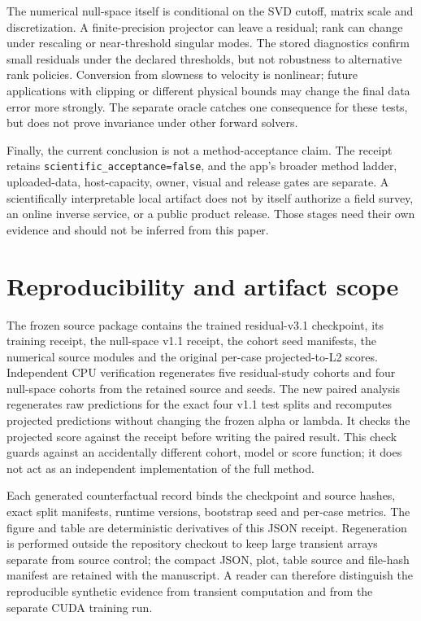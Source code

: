 \documentclass[11pt]{article}
\begin{document}
The numerical null-space itself is conditional on the SVD cutoff, matrix scale and discretization. A finite-precision projector can leave a residual; rank can change under rescaling or near-threshold singular modes. The stored diagnostics confirm small residuals under the declared thresholds, but not robustness to alternative rank policies. Conversion from slowness to velocity is nonlinear; future applications with clipping or different physical bounds may change the final data error more strongly. The separate oracle catches one consequence for these tests, but does not prove invariance under other forward solvers.

Finally, the current conclusion is not a method-acceptance claim. The receipt retains \texttt{scientific\_acceptance=false}, and the app's broader method ladder, uploaded-data, host-capacity, owner, visual and release gates are separate. A scientifically interpretable local artifact does not by itself authorize a field survey, an online inverse service, or a public product release. Those stages need their own evidence and should not be inferred from this paper.

\section{Reproducibility and artifact scope}\label{sec:reproducibility}
The frozen source package contains the trained residual-v3.1 checkpoint, its training receipt, the null-space v1.1 receipt, the cohort seed manifests, the numerical source modules and the original per-case projected-to-L2 scores. Independent CPU verification regenerates five residual-study cohorts and four null-space cohorts from the retained source and seeds. The new paired analysis regenerates raw predictions for the exact four v1.1 test splits and recomputes projected predictions without changing the frozen alpha or lambda. It checks the projected score against the receipt before writing the paired result. This check guards against an accidentally different cohort, model or score function; it does not act as an independent implementation of the full method.

Each generated counterfactual record binds the checkpoint and source hashes, exact split manifests, runtime versions, bootstrap seed and per-case metrics. The figure and table are deterministic derivatives of this JSON receipt. Regeneration is performed outside the repository checkout to keep large transient arrays separate from source control; the compact JSON, plot, table source and file-hash manifest are retained with the manuscript. A reader can therefore distinguish the reproducible synthetic evidence from transient computation and from the separate CUDA training run.
\end{document}
